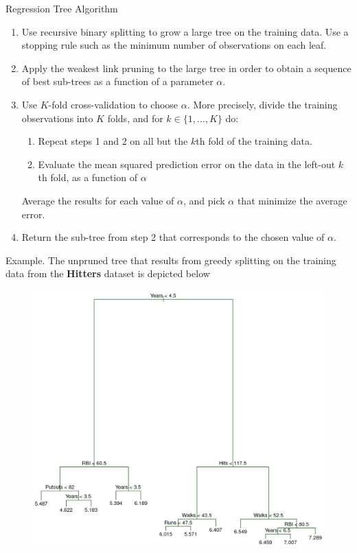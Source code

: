 \documentclass{beamer}
\begin{document}
\begin{frame}{Regression Tree Algorithm}
	\begin{enumerate}
		\item Use recursive binary splitting to grow a large tree on the training data. Use a stopping rule such as the minimum number of observations on each leaf.
		\item Apply the weakest link pruning  to the large tree in order to obtain a sequence of best sub-trees as a function of a parameter $\alpha$. 
		\item Use $K$-fold cross-validation to choose $\alpha$. More precisely, divide the training observations into $K$ folds, and for $k \in \{1,\ldots, K\}$ do:
		\begin{enumerate}
			\item Repeat steps 1 and 2 on all but the $k$th fold of the training data.
			\item Evaluate the mean squared prediction error on the data in the left-out $k$th fold, as a function of $\alpha$
		\end{enumerate} 
		Average the results for each value of $\alpha$, and pick $\alpha$ that minimize the average error.
		\item Return the sub-tree from step 2 that corresponds to the chosen value of $\alpha$.
	
	\end{enumerate}
\end{frame}

\begin{frame}{Example. }
	The unpruned tree that results from greedy splitting on the training data from the {\bf Hitters} dataset is depicted below

\begin{figure}[h]
	\centering
	\includegraphics[scale=0.3]{../../Figures/fig_hitters_full.png}
\end{figure}
\end{frame}
\end{document}
